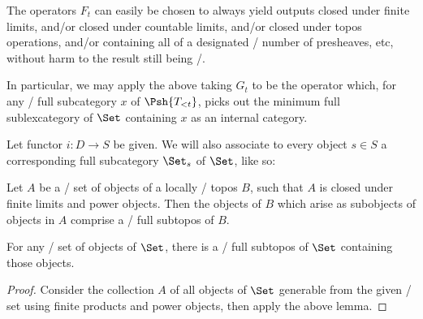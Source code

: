 The operators $F_t$ can easily be chosen to always yield outputs closed under finite limits, and/or closed under countable limits, and/or closed under topos operations, and/or containing all of a designated \setsmall/ number of presheaves, etc, without harm to the result still being \setsmall/.

In particular, we may apply the above taking $G_t$ to be the operator which, for any \setsmall/ full subcategory $x$ of $\Psh{T_{< t}}$, picks out the minimum full sublexcategory of $\Set$ containing $x$ as an internal category. 


\begin{construction}
Let functor $i : D \to S$ be given. We will also associate to every object $s \in S$ a corresponding full subcategory $\Set_s$ of $\Set$, like so: \TODO
\end{construction}

\begin{lemma}
Let $A$ be a \setsmall/ set of objects of a locally \setsmall/ topos $B$, such that $A$ is closed under finite limits and power objects. Then the objects of $B$ which arise as subobjects of objects in $A$ comprise a \setsmall/ full subtopos of $B$.
\end{lemma}

\begin{lemma}
For any \setsmall/ set of objects of $\Set$, there is a \setsmall/ full subtopos of $\Set$ containing those objects.
\end{lemma}
\begin{proof}
Consider the collection $A$ of all objects of $\Set$ generable from the given \setsmall/ set using finite products and power objects, then apply the above lemma.
\end{proof}

